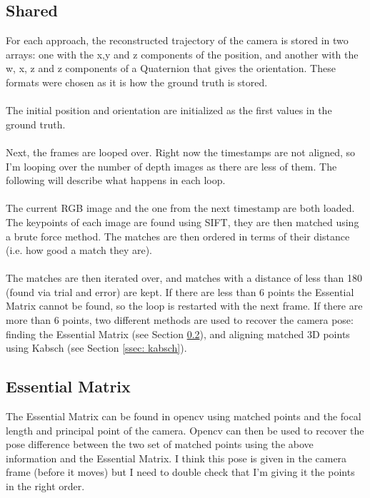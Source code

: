 \documentclass[12pt,a4paper]{article}
\begin{document}
\subsection{Shared}
For each approach, the reconstructed trajectory of the camera is stored in two arrays: one with the x,y and z components of the position, and another with the w, x, z and z components of a Quaternion that gives the orientation. These formats were chosen as it is how the ground truth is stored.
\\\\
The initial position and orientation are initialized as the first values in the ground truth.
\\\\
Next, the frames are looped over. Right now the timestamps are not aligned, so I'm looping over the number of depth images as there are less of them. The following will describe what happens in each loop.
\\\\
The current RGB image and the one from the next timestamp are both loaded. The keypoints of each image are found using SIFT, they are then matched using a brute force method. The matches are then ordered in terms of their distance (i.e. how good a match they are). 
\\\\
The matches are then iterated over, and matches with a distance of less than 180 (found via trial and error) are kept. If there are less than 6 points the Essential Matrix cannot be found, so the loop is restarted with the next frame. If there are more than 6 points, two different methods are used to recover the camera pose: finding the Essential Matrix (see Section \ref{ssec: essential mat}), and aligning matched 3D points using Kabsch (see Section \ref{ssec: kabsch}).

\subsection{Essential Matrix}
\label{ssec: essential mat}
The Essential Matrix can be found in opencv using matched points and the focal length and principal point of the camera. Opencv can then be used to recover the pose difference between the two set of matched points using the above information and the Essential Matrix. I think this pose is given in the camera frame (before it moves) but I need to double check that I'm giving it the points in the right order.
\end{document}
